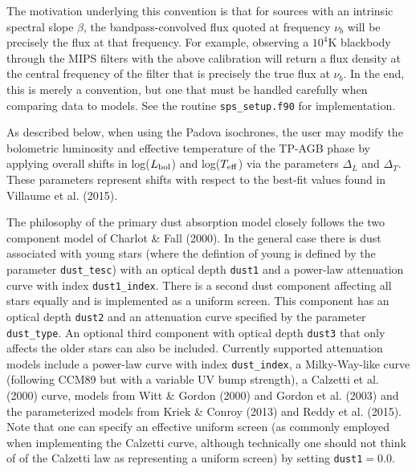 \documentclass[]{article}
\begin{document}
The motivation underlying this convention is that for sources with an intrinsic
spectral slope $\beta$, the bandpass-convolved flux quoted at frequency $\nu_b$
will be precisely the flux at that frequency. For example, observing a $10^4$K
blackbody through the MIPS filters with the above calibration will return a flux
density at the central frequency of the filter that is precisely the true flux
at $\nu_b$. In the end, this is merely a convention, but one that must be
handled carefully when comparing data to models.  See the routine
\texttt{sps\_setup.f90} for implementation.

\vspace{0.1in}
\vspace{0.1in}

\noindent
As described below, when using the Padova isochrones, the user may modify the
bolometric luminosity and effective temperature of the TP-AGB phase by applying
overall shifts in log($L_{\rm bol}$) and log($T_{\rm eff}$) via the parameters
$\Delta_L$ and $\Delta_T$.  These parameters represent shifts with respect to
the best-fit values found in Villaume et al. (2015).


\vspace{0.1in}
\vspace{0.1in}

\noindent
The philosophy of the primary dust absorption model closely follows the two
component model of Charlot \& Fall (2000).  In the general case there is dust
associated with young stars (where the defintion of young is defined by the
parameter \texttt{dust\_tesc}) with an optical depth \texttt{dust1} and a
power-law attenuation curve with index \texttt{dust1\_index}.  There is a second
dust component affecting all stars equally and is implemented as a uniform
screen.  This component has an optical depth \texttt{dust2} and an attenuation
curve specified by the parameter \texttt{dust\_type}.  An optional third
component with optical depth \texttt{dust3} that only affects the older stars
can also be included.  Currently supported attenuation models include a
power-law curve with index \texttt{dust\_index}, a Milky-Way-like curve
(following CCM89 but with a variable UV bump strength), a Calzetti et al. (2000)
curve, models from Witt \& Gordon (2000) and Gordon et al. (2003) and the
parameterized models from Kriek \& Conroy (2013) and Reddy et al. (2015).  Note
that one can specify an effective uniform screen (as commonly employed when
implementing the Calzetti curve, although technically one should not think of of
the Calzetti law as representing a uniform screen) by setting
\texttt{dust1}$=0.0$.
\end{document}
